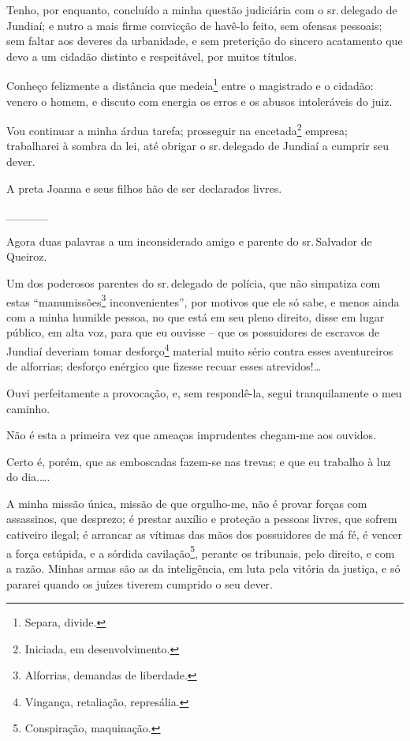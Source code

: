 \asterisc{}

Tenho, por enquanto, concluído a minha questão judiciária com o sr.\,delegado de Jundiaí; e nutro a mais firme convicção de havê-lo feito,
sem ofensas pessoais; sem faltar aos deveres da urbanidade, e sem
preterição do sincero acatamento que devo a um cidadão distinto e
respeitável, por muitos títulos.

Conheço felizmente a distância que medeia\footnote{ Separa, divide.}
entre o magistrado e o cidadão: venero o homem, e discuto com energia os
erros e os abusos intoleráveis do juiz.

Vou continuar a minha árdua tarefa; prosseguir na encetada\footnote{
  Iniciada, em desenvolvimento.} empresa; trabalharei à sombra da lei,
até obrigar o sr.\,delegado de Jundiaí a cumprir seu dever.

A preta Joanna e seus filhos hão de ser declarados livres.

\_\_\_\_\_

Agora duas palavras a um inconsiderado amigo e parente do sr.\,Salvador
de Queiroz.

Um dos poderosos parentes do sr.\,delegado de polícia, que não simpatiza
com estas ``manumissões\footnote{ Alforrias, demandas de liberdade.}
inconvenientes'', por motivos que ele só sabe, e menos ainda com a minha
humilde pessoa, no que está em seu pleno direito, disse em lugar
público, em alta voz, para que eu ouvisse -- que os possuidores de
escravos de Jundiaí deveriam tomar desforço\footnote{ Vingança,
  retaliação, represália.} material muito sério contra esses
aventureiros de alforrias; desforço enérgico que fizesse recuar esses
atrevidos!\ldots{}

Ouvi perfeitamente a provocação, e, sem respondê-la, segui
tranquilamente o meu caminho.

Não é esta a primeira vez que ameaças imprudentes chegam-me aos
ouvidos.

Certo é, porém, que as emboscadas fazem-se nas trevas; e que eu trabalho
à luz do dia.\ldots.

A minha missão única, missão de que orgulho-me, não é provar forças com
assassinos, que desprezo; é prestar auxílio e proteção a pessoas livres,
que sofrem cativeiro ilegal; é arrancar as vítimas das mãos dos
possuidores de má fé, é vencer a força estúpida, e a sórdida
cavilação\footnote{ Conspiração, maquinação.}, perante os tribunais,
pelo direito, e com a razão. Minhas armas são as da inteligência, em
luta pela vitória da justiça, e só pararei quando os juízes tiverem
cumprido o seu dever.

